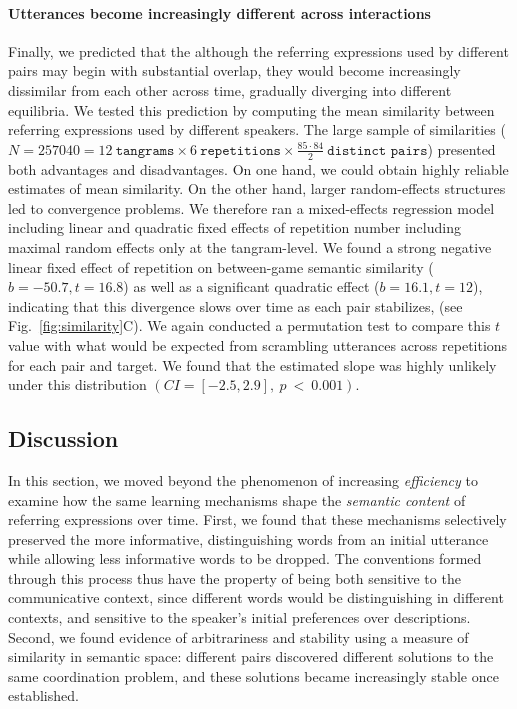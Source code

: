 \documentclass[alpha-refs]{wiley-article}
\begin{document}
\paragraph{Utterances become increasingly different across interactions}

Finally, we predicted that the although the referring expressions used by different pairs may begin with substantial overlap, they would become increasingly dissimilar from each other across time, gradually diverging into different equilibria.
We tested this prediction by computing the mean similarity between referring expressions used by different speakers.
The large sample of similarities ($N = 257040 = 12~\texttt{tangrams} \times 6~\texttt{repetitions} \times \frac{85 \cdot 84}{2}~\texttt{distinct pairs}$) presented both advantages and disadvantages.
On one hand, we could obtain highly reliable estimates of mean similarity. 
On the other hand, larger random-effects structures led to convergence problems.
We therefore ran a mixed-effects regression model including linear and quadratic fixed effects of repetition number including maximal random effects only at the tangram-level. 
We found a strong negative linear fixed effect of repetition on between-game semantic similarity ($b = -50.7, t= 16.8$) as well as a significant quadratic effect ($b= 16.1, t = 12$), indicating that this divergence slows over time as each pair stabilizes, (see Fig.~\ref{fig:similarity}C).
We again conducted a permutation test to compare this $t$ value with what would be expected from scrambling utterances across repetitions for each pair and target.
We found that the estimated slope was highly unlikely under this distribution $(CI = [-2.5, 2.9],~p~<~0.001)$. 

\subsection{Discussion}

In this section, we moved beyond the phenomenon of increasing \emph{efficiency} to examine how the same learning mechanisms shape the \emph{semantic content} of referring expressions over time.
First, we found that these mechanisms selectively preserved the more informative, distinguishing words from an initial utterance while allowing less informative words to be dropped. 
The conventions formed through this process thus have the property of being both sensitive to the communicative context, since different words would be distinguishing in different contexts, and  sensitive to the speaker's initial preferences over descriptions.
Second, we found evidence of arbitrariness and stability using a measure of similarity in semantic space: different pairs discovered different solutions to the same coordination problem, and these solutions became increasingly stable once established. 
\end{document}
